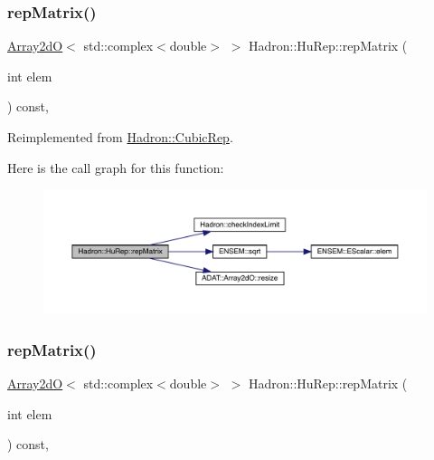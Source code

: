 \subsubsection{\texorpdfstring{repMatrix()}{repMatrix()}\hspace{0.1cm}{\footnotesize\ttfamily [1/3]}}
{\footnotesize\ttfamily \mbox{\hyperlink{classADAT_1_1Array2dO}{Array2dO}}$<$ std\+::complex$<$double$>$ $>$ Hadron\+::\+Hu\+Rep\+::rep\+Matrix (\begin{DoxyParamCaption}\item[{int}]{elem }\end{DoxyParamCaption}) const\hspace{0.3cm}{\ttfamily [inline]}, {\ttfamily [virtual]}}



Reimplemented from \mbox{\hyperlink{structHadron_1_1CubicRep_ac5d7e9e6f4ab1158b5fce3e4ad9e8005}{Hadron\+::\+Cubic\+Rep}}.

Here is the call graph for this function\+:
\nopagebreak
\begin{figure}[H]
\begin{center}
\leavevmode
\includegraphics[width=350pt]{d9/dd4/structHadron_1_1HuRep_a744a3604c724067d8912075d0d8acf59_cgraph}
\end{center}
\end{figure}
\mbox{\label{structHadron_1_1HuRep_a744a3604c724067d8912075d0d8acf59}} 
\subsubsection{\texorpdfstring{repMatrix()}{repMatrix()}\hspace{0.1cm}{\footnotesize\ttfamily [2/3]}}
{\footnotesize\ttfamily \mbox{\hyperlink{classADAT_1_1Array2dO}{Array2dO}}$<$ std\+::complex$<$double$>$ $>$ Hadron\+::\+Hu\+Rep\+::rep\+Matrix (\begin{DoxyParamCaption}\item[{int}]{elem }\end{DoxyParamCaption}) const\hspace{0.3cm}{\ttfamily [inline]}, {\ttfamily [virtual]}}



